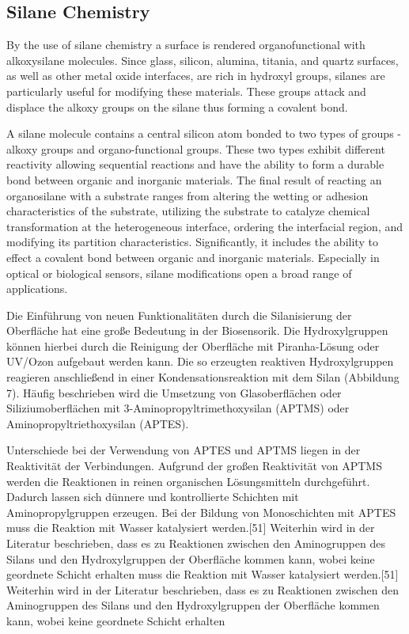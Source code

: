 \subsection{Silane Chemistry}

By the use of silane chemistry a surface is rendered organofunctional with alkoxysilane molecules. Since glass, silicon, alumina, titania, and quartz surfaces, as well as other metal oxide interfaces, are rich in hydroxyl groups, silanes are particularly useful for modifying these materials. These groups attack and displace the alkoxy groups on the silane thus forming a covalent  bond. \cite{lit:chem:silanizingGlass}

A silane molecule contains a central silicon atom bonded to two types of groups - alkoxy groups and organo-functional groups. These two types exhibit different reactivity allowing sequential reactions and have the ability to form a durable bond between organic and inorganic materials.
The final result of reacting an organosilane with a substrate ranges from altering the wetting or adhesion characteristics of the substrate, utilizing the substrate to catalyze chemical transformation at the heterogeneous interface, ordering the interfacial region, and modifying its partition characteristics. Significantly, it includes the ability to effect a covalent bond between organic and inorganic materials. Especially in optical or biological sensors, silane modifications open a broad range of applications. \cite{lit:chem:GELEST}

Die Einführung von neuen Funktionalitäten durch die Silanisierung der Oberfläche hat eine große Bedeutung in der Biosensorik. Die Hydroxylgruppen können hierbei durch die Reinigung der Oberfläche mit Piranha-Lösung oder UV/Ozon aufgebaut werden kann. Die so erzeugten reaktiven Hydroxylgruppen reagieren anschließend in einer Kondensationsreaktion mit dem Silan (Abbildung 7). Häufig beschrieben wird die Umsetzung von Glasoberflächen oder Siliziumoberflächen mit
3-Aminopropyltrimethoxysilan (APTMS) oder Aminopropyltriethoxysilan (APTES). 

Unterschiede bei der Verwendung von APTES und APTMS liegen in der Reaktivität der Verbindungen. Aufgrund der großen Reaktivität von APTMS werden die Reaktionen in reinen organischen Lösungsmitteln durchgeführt. Dadurch lassen sich dünnere und kontrollierte Schichten mit Aminopropylgruppen erzeugen. Bei der Bildung von Monoschichten mit APTES muss die Reaktion mit Wasser katalysiert werden.[51] Weiterhin wird in der Literatur beschrieben, dass es zu Reaktionen zwischen den Aminogruppen des Silans und den Hydroxylgruppen der Oberfläche kommen kann, wobei keine geordnete Schicht erhalten muss die Reaktion mit Wasser katalysiert werden.[51] Weiterhin wird in der Literatur beschrieben, dass es zu Reaktionen zwischen den Aminogruppen des Silans und den Hydroxylgruppen der Oberfläche kommen kann, wobei keine geordnete Schicht erhalten


